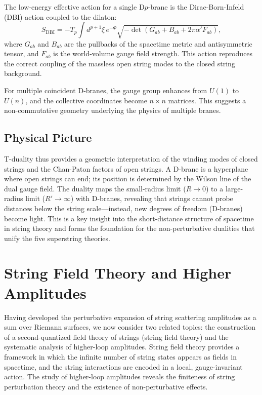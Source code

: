 \documentclass[11pt]{article}
\begin{document}
The low-energy effective action for a single D$p$-brane is the Dirac-Born-Infeld (DBI) action coupled to the dilaton:
\begin{equation}
S_{\text{DBI}} = -T_p \int d^{p+1}\xi \, e^{-\Phi} \sqrt{-\det(G_{ab} + B_{ab} + 2\pi\alpha' F_{ab})},
\end{equation}
where $G_{ab}$ and $B_{ab}$ are the pullbacks of the spacetime metric and antisymmetric tensor, and $F_{ab}$ is the world-volume gauge field strength. This action reproduces the correct coupling of the massless open string modes to the closed string background.

For multiple coincident D-branes, the gauge group enhances from $U(1)$ to $U(n)$, and the collective coordinates become $n\times n$ matrices. This suggests a non-commutative geometry underlying the physics of multiple branes.

\subsection{Physical Picture}

T-duality thus provides a geometric interpretation of the winding modes of closed strings and the Chan-Paton factors of open strings. A D-brane is a hyperplane where open strings can end; its position is determined by the Wilson line of the dual gauge field. The duality maps the small-radius limit ($R\to 0$) to a large-radius limit ($R'\to\infty$) with D-branes, revealing that strings cannot probe distances below the string scale—instead, new degrees of freedom (D-branes) become light. This is a key insight into the short-distance structure of spacetime in string theory and forms the foundation for the non-perturbative dualities that unify the five superstring theories.

\section{String Field Theory and Higher Amplitudes}

Having developed the perturbative expansion of string scattering amplitudes as a sum over Riemann surfaces, we now consider two related topics: the construction of a second-quantized field theory of strings (string field theory) and the systematic analysis of higher-loop amplitudes. String field theory provides a framework in which the infinite number of string states appears as fields in spacetime, and the string interactions are encoded in a local, gauge-invariant action. The study of higher-loop amplitudes reveals the finiteness of string perturbation theory and the existence of non-perturbative effects.
\end{document}
